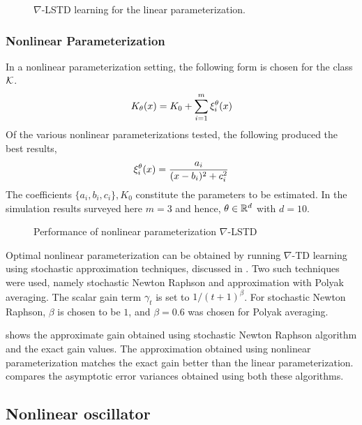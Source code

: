 \begin{figure}[h]
	\caption{$\nabla$-LSTD learning for the linear parameterization.}
	\label{f:lstd}
\end{figure}

\subsubsection*{Nonlinear Parameterization}
\label{sec_nl_param}
In a nonlinear parameterization setting, the following form is chosen for the class ${\cal K}$.
\begin{equation*}
K_\theta(x) = K_{0} + \sum_{i=1}^m \xi_{i}^{\theta}(x)
\end{equation*}
Of the various nonlinear parameterizations tested, the following produced the best results,
\begin{equation*}
\xi_{i}^{\theta}(x) = \dfrac{a_{i}}{(x -b_{i})^2 + c_{i}^2}
\end{equation*}
The coefficients $\{a_{i}, b_{i}, c_{i} \}, K_{0}$ constitute the parameters to be estimated.
In the simulation results surveyed here  $m=3$ and hence, $\theta \in \mathbb{R}^{d}$ with $d=10$.
\begin{figure}[h]
	\caption{Performance of nonlinear parameterization $\nabla$-LSTD}
	\label{f:nltd}
\end{figure}

Optimal nonlinear parameterization can be obtained by running $\nabla$-TD learning using stochastic approximation techniques, discussed in . Two such techniques were used, namely stochastic Newton Raphson and approximation with Polyak averaging\cite{bor08a}. The scalar gain term $\gamma_t$ is set to $1/(t+1)^{\beta}$. For stochastic Newton Raphson, $\beta$ is chosen to be $1$, and $\beta=0.6$ was chosen for Polyak averaging.

 shows the approximate gain obtained using stochastic Newton Raphson algorithm and the  exact gain values. The approximation obtained using nonlinear parameterization matches the exact gain better than the linear parameterization.  compares the asymptotic error variances obtained using both these algorithms.

\subsection{Nonlinear oscillator}
\label{section_nl_oscillator}

